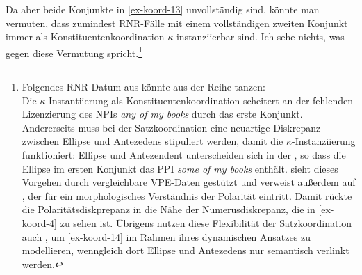 Da aber beide Konjunkte in \ref{ex-koord-13} unvollständig sind, könnte man vermuten, dass zumindest RNR-Fälle mit einem vollständigen zweiten Konjunkt immer als Konstituentenkoordination $\kappa$-instanziierbar sind. Ich sehe nichts, was gegen diese Vermutung spricht.\footnote{Folgendes RNR-Datum aus \citet[(23a)]{Cann:etal:05b} könnte aus der Reihe tanzen:\\
Die $\kappa$-Instantiierung als Konstituentenkoordination scheitert an der fehlenden Lizenzierung des NPIs {\it any of my books} durch das erste Konjunkt. Andererseits muss bei der Satzkoordination eine neuartige Diskrepanz zwischen Ellipse und Antezedens stipuliert werden, damit die $\kappa$-Instanziierung funktioniert: Ellipse und Antezendent unterscheiden sich in der , so dass die Ellipse im ersten Konjunkt das PPI {\it some of my books} enthält. \citet[81f]{Ha:08} sieht dieses Vorgehen durch vergleichbare VPE-Daten gestützt und verweist au\ss erdem auf \cite{Klima:64}, der für ein morphologisches Verständnis der Polarität eintritt. Damit rückte die Polaritätsdiskprepanz in die Nähe der Numerusdiskrepanz, die in \ref{ex-koord-4} zu sehen ist. Übrigens nutzen diese Flexibilität der Satzkoordination auch \cite{Cann:etal:05b}, um \ref{ex-koord-14} im Rahmen ihres dynamischen Ansatzes zu modellieren, wenngleich dort Ellipse und Antezedens nur semantisch verlinkt werden.
}
 
